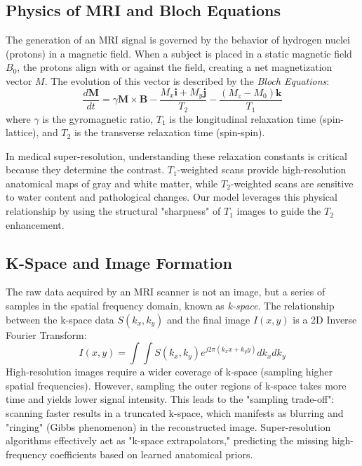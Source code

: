 \documentclass{IEEEoj}
\begin{document}
\subsection{Physics of MRI and Bloch Equations}
The generation of an MRI signal is governed by the behavior of hydrogen nuclei (protons) in a magnetic field. When a subject is placed in a static magnetic field $B_0$, the protons align with or against the field, creating a net magnetization vector $M$. The evolution of this vector is described by the \textit{Bloch Equations}:
\begin{equation}
    \frac{d\mathbf{M}}{dt} = \gamma \mathbf{M} \times \mathbf{B} - \frac{M_x \mathbf{i} + M_y \mathbf{j}}{T_2} - \frac{(M_z - M_0) \mathbf{k}}{T_1}
\end{equation}
where $\gamma$ is the gyromagnetic ratio, $T_1$ is the longitudinal relaxation time (spin-lattice), and $T_2$ is the transverse relaxation time (spin-spin). 

In medical super-resolution, understanding these relaxation constants is critical because they determine the contrast. $T_1$-weighted scans provide high-resolution anatomical maps of gray and white matter, while $T_2$-weighted scans are sensitive to water content and pathological changes. Our model leverages this physical relationship by using the structural "sharpness" of $T_1$ images to guide the $T_2$ enhancement.

\subsection{K-Space and Image Formation}
The raw data acquired by an MRI scanner is not an image, but a series of samples in the spatial frequency domain, known as \textit{k-space}. The relationship between the k-space data $S(k_x, k_y)$ and the final image $I(x, y)$ is a 2D Inverse Fourier Transform:
\begin{equation}
    I(x, y) = \int \int S(k_x, k_y) e^{j2\pi(k_x x + k_y y)} dk_x dk_y
\end{equation}
High-resolution images require a wider coverage of k-space (sampling higher spatial frequencies). However, sampling the outer regions of k-space takes more time and yields lower signal intensity. This leads to the "sampling trade-off": scanning faster results in a truncated k-space, which manifests as blurring and "ringing" (Gibbs phenomenon) in the reconstructed image. Super-resolution algorithms effectively act as "k-space extrapolators," predicting the missing high-frequency coefficients based on learned anatomical priors.
\end{document}
